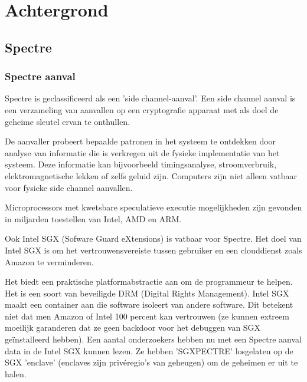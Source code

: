 \autocite{Redhat2018}







\chapter{Achtergrond}



\section{Spectre}

\subsection{Spectre aanval}
Spectre is geclassificeerd als een 'side channel-aanval'.
Een side channel aanval is een verzameling van aanvallen op een cryptografie apparaat met als doel de geheime sleutel ervan te onthullen.

De aanvaller probeert bepaalde patronen in het systeem te ontdekken door analyse van informatie die is verkregen uit de fysieke implementatie van het systeem. Deze informatie kan bijvoorbeeld timingsanalyse, stroomverbruik, elektromagnetische lekken of zelfs geluid zijn. \parencite{Touhafi2011}
Computers zijn niet alleen vatbaar voor fysieke side channel aanvallen.

Microprocessors met kwetsbare speculatieve executie mogelijkheden zijn gevonden in miljarden toestellen van Intel, AMD en ARM.

Ook Intel SGX (Sofware Guard eXtensions) is vatbaar voor Spectre. 
Het doel van Intel SGX is om het vertrouwensvereiste tussen gebruiker en een clouddienst zoals Amazon te verminderen.

Het biedt een praktische platformabstractie aan om de programmeur te helpen. 
Het is een soort van beveiligde DRM (Digital Rights Management).
Intel SGX maakt een container aan die software isoleert van andere software.
Dit betekent niet dat men Amazon of Intel 100 percent kan vertrouwen (ze kunnen extreem moeilijk garanderen dat ze geen backdoor voor het debuggen van SGX geïnstalleerd hebben).
Een aantal onderzoekers hebben nu met een Spectre aanval data in de Intel SGX kunnen lezen.
Ze hebben 'SGXPECTRE'  losgelaten op de SGX 'enclave' (enclaves zijn privéregio's van geheugen) om de geheimen er uit te halen.

